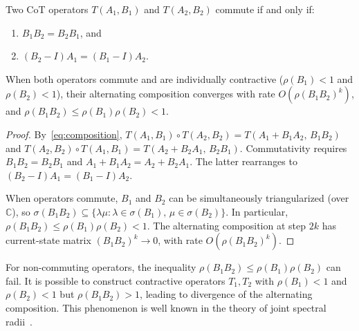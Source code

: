 \begin{proposition}\label{prop:commute}
  Two CoT operators $T(A_1,B_1)$ and $T(A_2,B_2)$ commute if and only if:
  \begin{enumerate}[label=\textup{(\roman*)}]
    \item $B_1 B_2=B_2 B_1$, and
    \item $(B_2-I)A_1=(B_1-I)A_2$.
  \end{enumerate}
  When both operators commute and are individually contractive
  \textup{(}$\rho(B_1)<1$ and $\rho(B_2)<1$\textup{)}, their alternating
  composition converges with rate $O(\rho(B_1 B_2)^k)$, and
  $\rho(B_1 B_2)\leq\rho(B_1)\rho(B_2)<1$.
\end{proposition}

\begin{proof}
  By~\eqref{eq:composition}, $T(A_1,B_1)\circ T(A_2,B_2)=
  T(A_1+B_1 A_2,\,B_1 B_2)$ and $T(A_2,B_2)\circ T(A_1,B_1)=
  T(A_2+B_2 A_1,\,B_2 B_1)$. Commutativity requires $B_1 B_2=B_2 B_1$ and
  $A_1+B_1 A_2=A_2+B_2 A_1$. The latter rearranges to
  $(B_2-I)A_1=(B_1-I)A_2$.

  When operators commute, $B_1$ and $B_2$ can be simultaneously
  triangularized (over~$\mathbb{C}$), so $\sigma(B_1 B_2)\subseteq
  \{\lambda\mu:\lambda\in\sigma(B_1),\,\mu\in\sigma(B_2)\}$. In particular,
  $\rho(B_1 B_2)\leq\rho(B_1)\rho(B_2)<1$. The alternating composition
  at step $2k$ has current-state matrix $(B_1 B_2)^k\to 0$, with rate
  $O(\rho(B_1 B_2)^k)$.
\end{proof}

\begin{remark}\label{rem:noncommute}
  For non-commuting operators, the inequality $\rho(B_1 B_2)\leq
  \rho(B_1)\rho(B_2)$ can fail. It is possible to construct contractive
  operators $T_1,T_2$ with $\rho(B_1)<1$ and $\rho(B_2)<1$ but
  $\rho(B_1 B_2)>1$, leading to divergence of the alternating composition.
  This phenomenon is well known in the theory of joint spectral
  radii~\cite{Berger1992}.
\end{remark}

